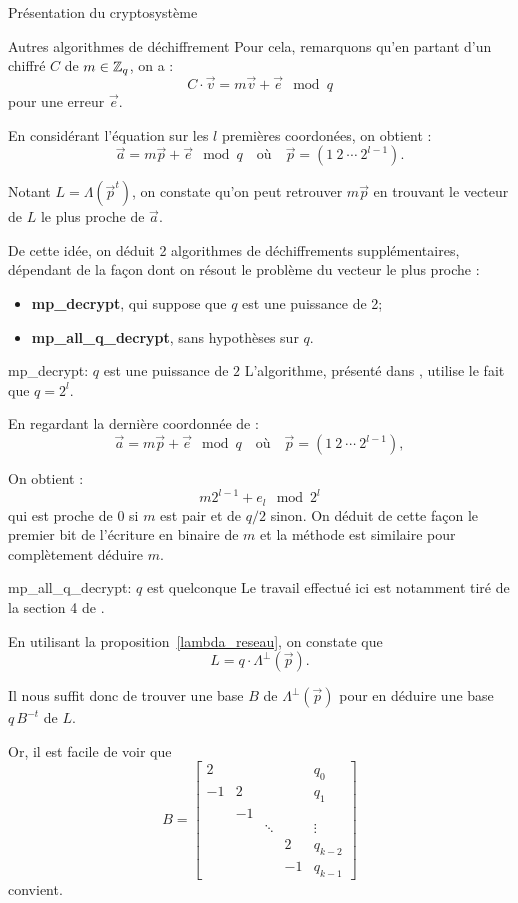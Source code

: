 \begin{section}{Présentation du cryptosystème}
\begin{subsection}{Autres algorithmes de déchiffrement}
	Pour cela, remarquons qu'en partant d'un chiffré  $C$ de $m \in \mathbb{Z}_q$, on a :
	\[ C \cdot \vec{v} = m \vec{v} + \vec{e} \mod q \]
	pour une erreur $\vec{e}$.
	
	En considérant l'équation sur les $l$ premières coordonées, on obtient :
	\[\vec{a} = m \vec{p} + \vec{e} \mod q\quad \text{où}\quad \vec{p} = (1\:2\:\cdots\:2^{l-1}). \]
 
	Notant $L = \Lambda(\vec{p}^t)$, on constate qu'on peut retrouver $m\vec{p}$ en trouvant le vecteur de $L$ le plus proche de $\vec{a}$.

	De cette idée, on déduit 2 algorithmes de déchiffrements supplémentaires, dépendant de la façon dont on résout le problème du vecteur le plus proche :

\begin{itemize}
\item \textbf{mp\_decrypt}, qui suppose que $q$ est une puissance de 2;
\item \textbf{mp\_all\_q\_decrypt}, sans hypothèses sur $q$.
\end{itemize}

\begin{subsubsection}{mp\_decrypt: $q$ est une puissance de $2$}
	L'algorithme, présenté dans \cite{EPRINT:GenSahWat13}, utilise le fait que $q = 2^l$.

	En regardant la dernière coordonnée de :
\[\vec{a} = m \vec{p} + \vec{e} \mod q\quad \text{où}\quad \vec{p} = (1\:2\:\cdots\:2^{l-1}), \]
 
	On obtient :
\[m 2^{l-1} + e_{l} \mod 2^l \]
	qui est proche de 0 si $m$ est pair et de $q/2$ sinon. On déduit de cette façon le premier bit de l'écriture en binaire de $m$ et la méthode est similaire pour complètement déduire $m$.
	
\end{subsubsection}
\begin{subsubsection}{mp\_all\_q\_decrypt: $q$ est quelconque}
	Le travail effectué ici est notamment tiré de la section 4 de \cite{EC:MicPei12}.

	En utilisant la proposition~\ref{lambda_reseau}, on constate que
\[ L = q \cdot \Lambda^\bot\left(\vec{p}\right). \]

	Il nous suffit donc de trouver une base $B$ de $\Lambda^\bot\left(\vec{p}\right)$ pour en déduire une base $q \, B^{-t}$ de $L$.

	Or, il est facile de voir que
\[ B = \begin{bmatrix} 
	2 & &&& q_0\\  
	-1 & 2 &&& q_1\\
   & -1 \\ 
	&    & \ddots & & \vdots \\
	&    &       &  2 & q_{k-2} \\
	&    &       &  -1 & q_{k-1}
\end{bmatrix}\]
convient.


\end{subsubsection}
\end{subsection}
\end{section}
